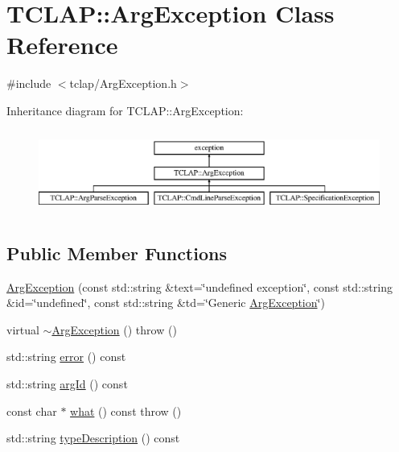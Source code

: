\hypertarget{class_t_c_l_a_p_1_1_arg_exception}{}\section{T\+C\+L\+A\+P\+:\+:Arg\+Exception Class Reference}
\label{class_t_c_l_a_p_1_1_arg_exception}


{\ttfamily \#include $<$tclap/\+Arg\+Exception.\+h$>$}

Inheritance diagram for T\+C\+L\+A\+P\+:\+:Arg\+Exception\+:\begin{figure}[H]
\begin{center}
\leavevmode
\includegraphics[height=2.758621cm]{class_t_c_l_a_p_1_1_arg_exception}
\end{center}
\end{figure}
\subsection*{Public Member Functions}
\begin{DoxyCompactItemize}
\item 
\hyperlink{class_t_c_l_a_p_1_1_arg_exception_a67389912b628e95d530f8bb8de97b309}{Arg\+Exception} (const std\+::string \&text=\char`\"{}undefined exception\char`\"{}, const std\+::string \&id=\char`\"{}undefined\char`\"{}, const std\+::string \&td=\char`\"{}Generic \hyperlink{class_t_c_l_a_p_1_1_arg_exception}{Arg\+Exception}\char`\"{})
\item 
virtual \hyperlink{class_t_c_l_a_p_1_1_arg_exception_a5c5df6a814b05c623a01607fb82980f4}{$\sim$\+Arg\+Exception} ()  throw ()
\item 
std\+::string \hyperlink{class_t_c_l_a_p_1_1_arg_exception_a0656dab88a7129bc288821bacd653d08}{error} () const 
\item 
std\+::string \hyperlink{class_t_c_l_a_p_1_1_arg_exception_a18ffd1ad34c1799865f8e03df4ebdff1}{arg\+Id} () const 
\item 
const char $\ast$ \hyperlink{class_t_c_l_a_p_1_1_arg_exception_af51c89da2e4ae54fc9d05038ea484c83}{what} () const   throw ()
\item 
std\+::string \hyperlink{class_t_c_l_a_p_1_1_arg_exception_abd271955e1b808bb92f8db7a16ea7c95}{type\+Description} () const 
\end{DoxyCompactItemize}


